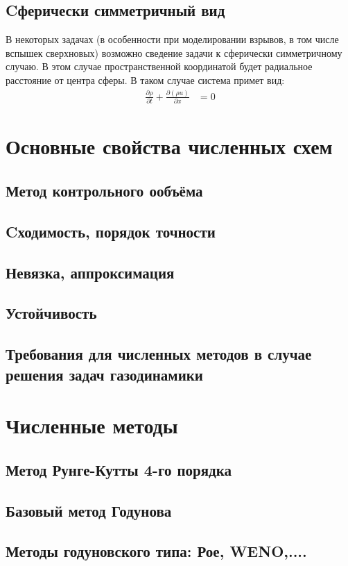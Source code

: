 \documentclass[a4paper,12pt]{extarticle}
\begin{document}
\subsection{Cферически симметричный вид}
    В некоторых задачах (в особенности при моделировании взрывов, в том числе вспышек сверхновых) возможно сведение задачи к сферически симметричному случаю. В этом случае пространственной координатой будет радиальное расстояние от центра сферы. В таком случае система примет вид:
    \begin{align}
        \frac{\partial \rho}{\partial t} + \frac{\partial (\rho u)}{\partial x} &= 0
    \end{align}

\section{Основные свойства численных схем}
\subsection{Метод контрольного ообъёма}
\subsection{Cходимость, порядок точности}
\subsection{Невязка, аппроксимация}
\subsection{Устойчивость}
\subsection{Требования для численных методов в случае решения задач газодинамики}


\section{Численные методы}
\subsection{Метод Рунге-Кутты 4-го порядка}
\subsection{Базовый метод Годунова}
\subsection{Методы годуновского типа:       Рое, WENO,....}
\end{document}
